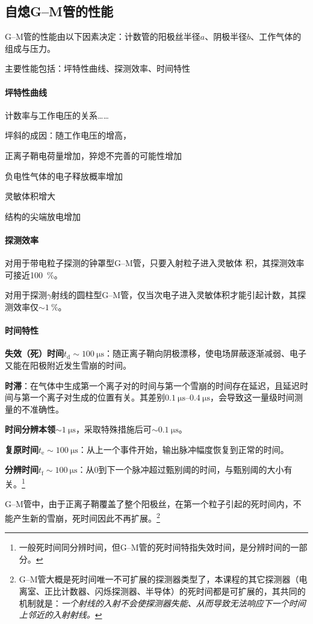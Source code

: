 \subsection{自熄G--M管的性能}

G--M管的性能由以下因素决定：计数管的阳极丝半径$a$、阴极半径$b$、工作气体的组成与压力。

主要性能包括：坪特性曲线、探测效率、时间特性
\paragraph{坪特性曲线}计数率与工作电压的关系……

坪斜的成因：随工作电压的增高，
\begin{compactenum}
	\item 正离子鞘电荷量增加，猝熄不完善的可能性增加
	\item 负电性气体的电子释放概率增加
	\item 灵敏体积增大
	\item 结构的尖端放电增加
\end{compactenum}
\paragraph{探测效率}
对用于带电粒子探测的钟罩型G--M管，只要入射粒子进入灵敏体
积，其探测效率可接近\qty{100}{\percent}。

对用于探测$\gamma$射线的圆柱型G--M管，仅当次电子进入灵敏体积才能引起计数，其探测效率仅$\sim \qty{1}{\percent}$。
\paragraph{时间特性}
\begin{compactitem}
	\item \textbf{失效（死）时间}$t_\mathrm d \sim \qty{100}{\micro\second}$：随正离子鞘向阴极漂移，使电场屏蔽逐渐减弱、电子又能在阳极附近发生雪崩的时间。
	\item \textbf{时滞}：在气体中生成第一个离子对的时间与第一个雪崩的时间存在延迟，且延迟时间与第一个离子对生成的位置有关。其差别$\qtyrange{0.1}{0.4}{\micro\second}$，会导致这一量级时间测量的不准确性。
	\item \textbf{时间分辨本领}$\sim \qty{1}{\micro\second}$，采取特殊措施后可$\sim \qty{0.1}{\micro\second}$。
	\item \textbf{复原时间}$t_\mathrm e \sim \qty{100}{\micro\second}$：从上一个事件开始，输出脉冲幅度恢复到正常的时间。
	\item \textbf{分辨时间}$t_\mathrm f \sim \qty{100}{\micro\second}$：从0到下一个脉冲超过甄别阈的时间，与甄别阈的大小有关。\footnote{一般死时间同分辨时间，但G--M管的死时间特指失效时间，是分辨时间的一部分。}
\end{compactitem}
G--M管中，由于正离子鞘覆盖了整个阳极丝，在第一个粒子引起的死时间内，不能产生新的雪崩，死时间因此不再扩展。\footnote{G--M管大概是死时间唯一不可扩展的探测器类型了，本课程的其它探测器（电离室、正比计数器、闪烁探测器、半导体）的死时间都是可扩展的，其共同的机制就是：\textit{一个射线的入射不会使探测器失能、从而导致无法响应下一个时间上邻近的入射射线。}}

